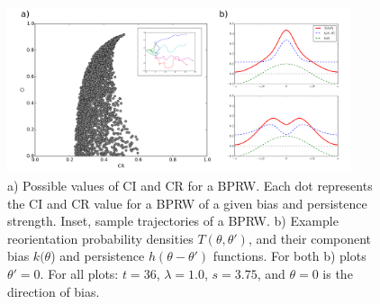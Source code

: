 \begin{figure}[ht]
    \centering
    \includegraphics[width=0.90\textwidth]{../fig/ch2_fig6.png}
    \caption{a) Possible values of CI and CR for a BPRW. Each dot represents the CI and CR value for a BPRW of a given bias and persistence strength. Inset, sample trajectories of a BPRW. b) Example reorientation probability densities $T(\theta,\theta')$, and their component bias $k(\theta$) and persistence $h(\theta-\theta')$ functions. For both b) plots $\theta'=0$. For all plots: $t =36$, $\lambda = 1.0$, $s = 3.75$, and $\theta=0$ is the direction of bias.}
    \label{fig:ch2_6}
\end{figure}

